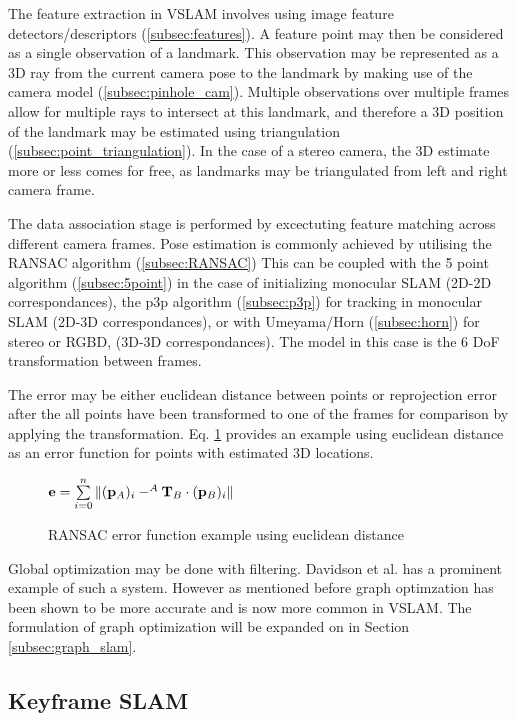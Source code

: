 The feature extraction in VSLAM involves using image feature detectors/descriptors (\ref{subsec:features}).  A feature point may then be considered as a single observation of a landmark.  This observation may be represented as a 3D ray from the current camera pose to the landmark by making use of the camera model (\ref{subsec:pinhole_cam}).  Multiple observations over multiple frames allow for multiple rays to intersect at this landmark, and therefore a 3D position of the landmark may be estimated using triangulation (\ref{subsec:point_triangulation}). In the case of a stereo camera, the 3D estimate more or less comes for free, as landmarks may be triangulated from left and right camera frame.

The data association stage is performed by excectuting feature matching across different camera frames. Pose estimation is commonly achieved by utilising the RANSAC algorithm (\ref{subsec:RANSAC}) This can be coupled with the 5 point algorithm (\ref{subsec:5point}) in the case of initializing monocular SLAM (2D-2D correspondances), the p3p algorithm (\ref{subsec:p3p}) for tracking in monocular SLAM (2D-3D correspondances), or with Umeyama/Horn (\ref{subsec:horn}) for stereo or RGBD, (3D-3D correspondances). The model in this case is the 6 DoF transformation between frames. 

The error may be either euclidean distance between points or reprojection error after the all points have been transformed to one of the frames for comparison by applying the transformation. Eq. \ref{eq:ransac_error} provides an example using euclidean distance as an error function for points with estimated 3D locations.

\begin{figure}[h]
 \centering
 \begin{math}
  \mathbf{e} = \sum\limits_{i=0}^n \| (\mathbf p_A)_i - ^A\mathbf T_B \cdot (\mathbf p_B)_i \|
 \end{math}
 \caption{RANSAC error function example using euclidean distance}
 \label{eq:ransac_error}
\end{figure}

Global optimization may be done with filtering.  Davidson et al. has a prominent example of such a system.  However as mentioned before graph optimzation has been shown to be more accurate and is now more common in VSLAM.  The formulation of graph optimization will be expanded on in Section \ref{subsec:graph_slam}.

\subsection{Keyframe SLAM}

